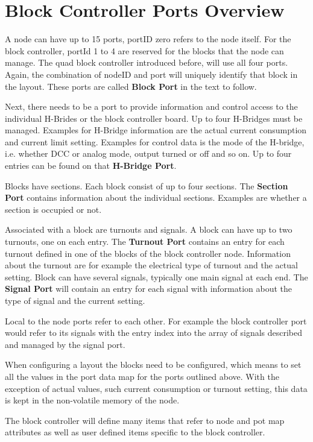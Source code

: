\section{Block Controller Ports Overview}

A node can have up to 15 ports, portID zero refers to the node itself. For the block controller, portId 1 to 4 are reserved for the blocks that the node can manage. The quad block controller introduced before, will use all four ports. Again, the combination of nodeID and port will uniquely identify that block in the layout. These ports are called \textbf{Block Port} in the text to follow.

Next, there needs to be a port to provide information and control access to the individual H-Brides or the block controller board. Up to four H-Bridges must be managed. Examples for H-Bridge information are the actual current consumption and current limit setting. Examples for control data is the mode of the H-bridge, i.e. whether DCC or analog mode, output turned or off and so on. Up to four entries can be found on that \textbf{H-Bridge Port}.

Blocks have sections. Each block consist of up to four sections. The \textbf{Section Port} contains information about the individual sections. Examples are whether a section is occupied or not.

Associated with a block are turnouts and signals. A block can have up to two turnouts, one on each entry. The \textbf{Turnout Port} contains an entry for each turnout defined in one of the blocks of the block controller node. Information about the turnout are for example the electrical type of turnout and the actual setting. Block can have several signals, typically one main signal at each end. The \textbf{Signal Port} will contain an entry for each signal with information about the  type of signal and the current setting.

Local to the node ports refer to each other. For example the block controller port would refer to its signals with the entry index into the array of signals described and managed by the signal port.

When configuring a layout the blocks need to be configured, which means to set all the values in the port data map for the ports outlined above. With the exception of actual values, such current consumption or turnout setting, this data is kept in the non-volatile memory of the node.

The block controller will define many items that refer to node and pot map attributes as well as user defined items specific to the block controller.

